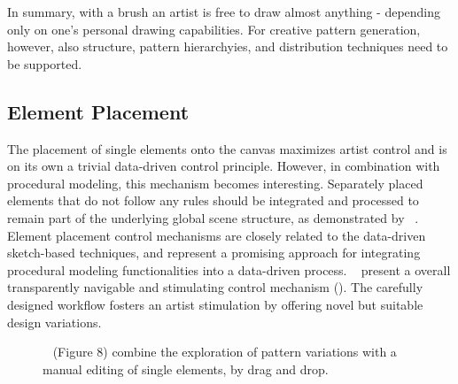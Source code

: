 

In summary, with a brush an artist is free to draw almost anything - depending only on one's personal drawing capabilities. For creative pattern generation, however, also structure, pattern hierarchyies, and distribution techniques need to be supported. 



\subsection{Element Placement}
\label{subsubsec:analysis_creative_means_elements}

The placement of single elements onto the canvas maximizes artist control and is on its own a trivial data-driven control principle. However, in combination with procedural modeling, this mechanism becomes interesting. Separately placed elements that do not follow any rules should be integrated and processed to remain part of the underlying global scene structure, as demonstrated by \citeauthor*{gieseke_2017_ooo}~\cite{gieseke_2017_ooo}.
Element placement control mechanisms are closely related to the data-driven sketch-based techniques, and represent a promising approach for integrating procedural modeling functionalities into a data-driven process. \citeauthor*{guerrero_2016_pep}~\cite{guerrero_2016_pep} present a overall transparently navigable and stimulating control mechanism (). The carefully designed workflow fosters an artist stimulation by offering novel but suitable design variations.

\begin{figure}[H]
    \centering
    \caption{\label{fig:guerrero_2016_pep}\citeauthor*{guerrero_2016_pep}~\cite{guerrero_2016_pep} (Figure 8) combine the exploration of pattern variations with a manual editing of single elements, \eg by drag and drop.}
\end{figure}